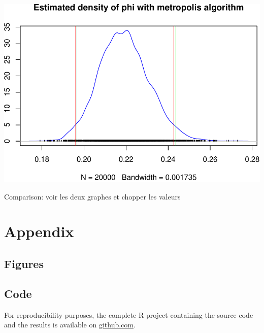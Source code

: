 \documentclass[a4paper, 12pt]{article}
\begin{document}
    \begin{center}\includegraphics[width=0.8\linewidth]{resources/figs/unnamed-chunk-17-2} \end{center}

    Comparison: voir les deux graphes et chopper les valeurs

    \appendix

    \hypertarget{appendix}{%
    \section{Appendix}\label{appendix}}

    \hypertarget{figures}{%
    \subsection{Figures}\label{figures}}

    \hypertarget{code}{%
    \subsection{Code}\label{code}}

    \bigskip
    \begin{mdframed}[style=thicc, frametitle=Note, frametitlebackgroundcolor=black!30]
      For reproducibility purposes, the complete R project containing the source code and the results is available on \href{https://github.com/AdrienKinart/LSTAT2130BayesianProject}{github.com}.
    \end{mdframed}
\end{document}
